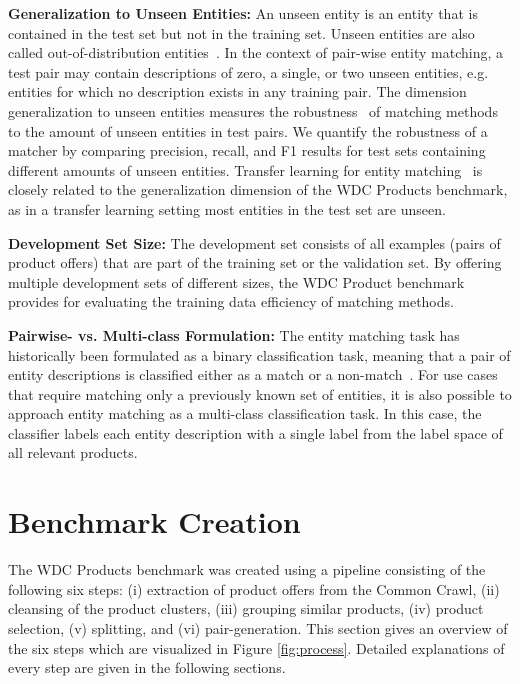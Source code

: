 \documentclass[sigconf,edbt]{acmart-edbt2024}
\begin{document}
\textbf{Generalization to Unseen Entities:} An unseen entity is an entity that is contained in the test set but not in the training set. Unseen entities are also called out-of-distribution entities~\cite{yangGeneralizedOutofDistributionDetection2022}. In the context of pair-wise entity matching, a test pair may contain descriptions of zero, a single, or two unseen entities, e.g. entities for which no description exists in any training pair. The dimension generalization to unseen entities measures the robustness~\cite{dziugaiteSearchRobustMeasures2020,musaviGeneralizationAbilityNeural1994} of  matching methods to the amount of unseen entities in test pairs. We quantify the robustness of a matcher by comparing precision, recall, and F1 results for test sets containing different amounts of unseen entities. Transfer learning for entity matching~\cite{trabelsiDAMEDomainAdaptation2022,tuDomainAdaptationDeep2022,akbarianrastaghiProbingRobustnessPretrained2022} is closely related to the generalization dimension of the WDC Products benchmark, as in a transfer learning setting most entities in the test set are unseen.

\textbf{Development Set Size:} The  development set consists of all examples (pairs of product offers) that are part of the training set or the validation set. By offering multiple development sets of different sizes, the WDC Product benchmark provides for evaluating the training data efficiency of matching methods.

\textbf{Pairwise- vs. Multi-class Formulation:} The entity matching task has historically been formulated as a binary classification task, meaning that a pair of entity descriptions is classified either as a match or a non-match~\cite{christophides_end--end_2020,BarlaugNeural2021,Christen2012DataMC,elmagarmidDuplicateRecordDetection2007}. For use cases that require matching only a previously known set of entities, it is also possible to approach entity matching as a multi-class classification task. In this case, the classifier labels each entity description with a single label from the label space of all relevant products.

 \section{Benchmark Creation}
\label{sec:creation}




The WDC Products benchmark was created using a pipeline consisting of the following six steps: (i) extraction of product offers from the Common Crawl, (ii) cleansing of the product clusters, (iii) grouping similar products, (iv) product selection, (v) splitting, and (vi) pair-generation. This section gives an overview of the six steps which are visualized in Figure \ref{fig:process}. Detailed explanations of every step are given in the following sections.
\end{document}
